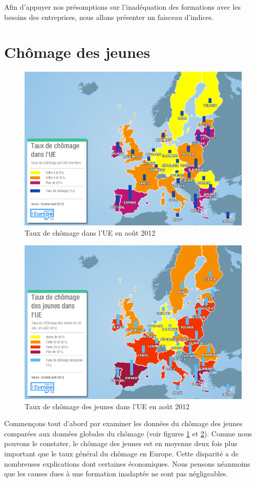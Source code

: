 Afin d'appuyer nos présomptions sur l'inadéquation des formations avec les besoins des entreprises, nous allons présenter un faisceau d'indices.

\section{Chômage des jeunes}
\begin{figure}[p]
\centering
\includegraphics[width=0.98\linewidth]{../resources/illustrations/chom}
\caption{Taux de chômage dans l'UE en août 2012 \cite{chom}}
\label{chom}
\end{figure}
\begin{figure}[p]
\centering
\includegraphics[width=0.98\linewidth]{../resources/illustrations/chom_jeunes}
\caption{Taux de chômage des jeunes dans l'UE en août 2012 \cite{chom_jeunes}}
\label{chom_jeunes}
\end{figure}
Commençons tout d'abord par examiner les données du chômage des jeunes comparées aux données globales du chômage (voir figures \ref{chom} et \ref{chom_jeunes}). Comme nous pouvons le constater, le chômage des jeunes est en moyenne deux fois plus important que le taux général du chômage en Europe. Cette disparité a de nombreuses explications dont certaines économiques. Nous pensons néanmoins que les causes dues à une formation inadaptée ne sont pas négligeables. 


